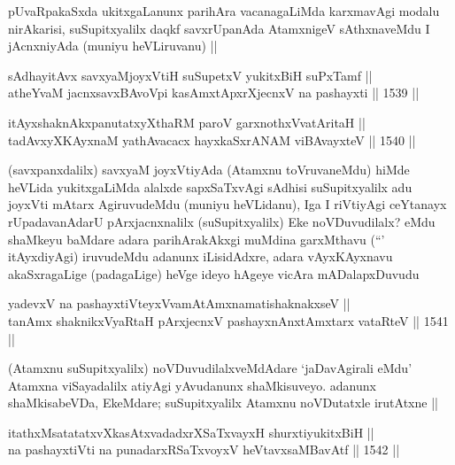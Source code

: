 \begin{artha}
pUvaRpakaSxda ukitxgaLanunx parihAra vacanagaLiMda karxmavAgi modalu nirAkarisi, suSupitxyalilx daqkf savxrUpanAda AtamxnigeV sAthxnaveMdu I jAcnxniyAda (muniyu heVLiruvanu) ||
\end{artha}


\begin{shl}
sAdhayitAvx savxyaMjoyxVtiH suSupetxV yukitxBiH suPxTamf || \\
atheYvaM jacnxsavxBAvoV\s pi kasAmxtApxrXjecnxV na pashayxti ||  1539 ||  
\end{shl}
				
\begin{shl}
itAyxshaknAkxpanutatxyXthaRM paroV garxnothxV\s vatAritaH || \\
tadAvxyXKAyxnaM yathAvacacx hayxkaSxrANAM viBAvayxteV ||  1540 ||  
\end{shl}


\begin{artha}
(savxpanxdalilx) savxyaM joyxVtiyAda (Atamxnu toVruvaneMdu) hiMde heVLida yukitxgaLiMda alalxde sapxSaTxvAgi sAdhisi suSupitxyalilx adu joyxVti mAtarx AgiruvudeMdu (muniyu heVLidanu), Iga I riVtiyAgi ceYtanayx rUpadavanAdarU pArxjacnxnalilx (suSupitxyalilx) Eke noVDuvudilalx? eMdu shaMkeyu baMdare adara parihArakAkxgi muMdina garxMthavu (``\stext' itAyxdiyAgi) iruvudeMdu adanunx iLisidAdxre, adara vAyxKAyxnavu akaSxragaLige (padagaLige) heVge ideyo hAgeye vicAra mADalapxDuvudu
\end{artha}

\begin{shl}
yadevxV na pashayxtiVteyxVvamAtAmxnamatishaknakxseV || \\
tanAmx shaknikxVyaRtaH pArxjecnxV pashayxnAnxtAmx\s tarx vataRteV ||  1541 ||  
\end{shl}

\begin{artha}
(Atamxnu suSupitxyalilx) noVDuvudilalxveMdAdare `jaDavAgirali eMdu' Atamxna viSayadalilx atiyAgi yAvudanunx shaMkisuveyo. adanunx shaMkisabeVDa, EkeMdare; suSupitxyalilx Atamxnu noVDutatxle irutAtxne ||
\end{artha}


\begin{shl}
itathxMsatatatxvXkasAtxvadadxrXSaTxvayxH shurxtiyukitxBiH || \\
na pashayxtiVti na punadarxRSaTxvoyxV heVtavxsaMBavAtf ||  1542 ||  
\end{shl}

